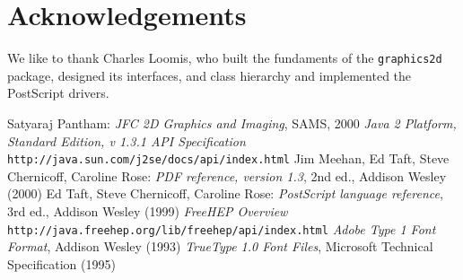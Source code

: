 \documentclass[a4paper]{article}
\newcommand{\class}[1]{\texttt{#1}}
\newcommand{\fhclass}[1]{\class{#1}}
\newcommand{\ps}{PostScript}
\newcommand{\booktitle}[1]{\textit{#1}}
\begin{document}
\section{Acknowledgements}

We like to thank Charles Loomis, who built the fundaments of the
\fhclass{graphics2d} package, designed its interfaces, and class
hierarchy and implemented the \ps{} drivers.






\begin{thebibliography}{99}
Satyaraj Pantham: \booktitle{JFC 2D Graphics and
  Imaging}, SAMS, 2000
\booktitle{Java 2 Platform, Standard Edition, v 1.3.1
  API Specification}
  \texttt{http://java.sun.com/j2se/docs/api/index.html}
Jim Meehan, Ed Taft, Steve Chernicoff, Caroline Rose:
  \booktitle{PDF reference, version 1.3}, 2nd ed., Addison Wesley (2000)
Ed Taft, Steve Chernicoff, Caroline Rose:
  \booktitle{PostScript language reference}, 3rd ed., Addison Wesley
  (1999)
\booktitle{FreeHEP Overview}
  \texttt{http://java.freehep.org/lib/freehep/api/index.html}
\booktitle{Adobe Type 1 Font Format}, Addison Wesley
  (1993)
\booktitle{TrueType 1.0 Font Files}, Microsoft Technical
  Specification (1995)
\end{thebibliography}
\end{document}
